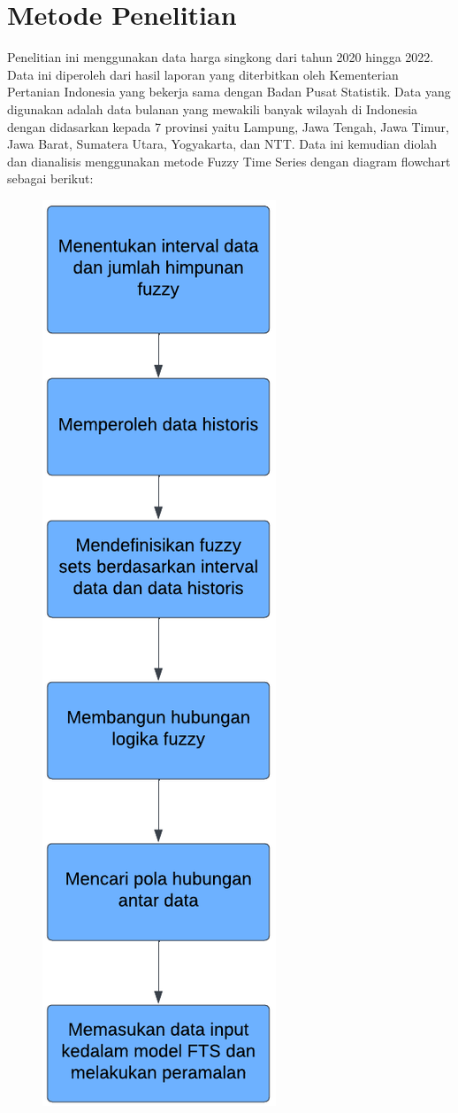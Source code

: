\documentclass[conference]{IEEEtran}
\begin{document}
\section{Metode Penelitian}

Penelitian ini menggunakan data harga singkong dari tahun 2020 hingga 2022. Data ini diperoleh dari hasil laporan yang diterbitkan oleh Kementerian Pertanian Indonesia yang bekerja sama dengan Badan Pusat Statistik. Data yang digunakan adalah data bulanan yang mewakili banyak wilayah di Indonesia dengan didasarkan kepada 7 provinsi yaitu Lampung, Jawa Tengah, Jawa Timur, Jawa Barat, Sumatera Utara, Yogyakarta, dan NTT. Data ini kemudian diolah dan dianalisis menggunakan metode Fuzzy Time Series dengan diagram flowchart sebagai berikut:

\begin{figure}[htbp]
    \centering
    {\includegraphics[scale=0.7]{flowchart.png}} 

\end{figure}
\end{document}
